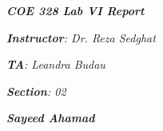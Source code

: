

\begin{titlepage}
    \begin{center}
        \vspace*{1cm}
            
        \date{}
            
        \huge
            
        \textit{\textbf{COE 328 Lab VI Report}}
            
        \vspace{0.25cm}
        
        \vspace{2.5cm}
            
            
            
		\vspace{0.25cm}
            
            
        \LARGE
            

		\textit{\textbf{Instructor}: Dr. Reza Sedghat}

		\textit{\textbf{TA}: Leandra Budau}

		\textit{\textbf{Section}: 02}

		\vspace{2.5cm}

		\vspace{2.5cm}
		
		\vspace{1.5cm}

		\textit{\textbf{Sayeed Ahamad}}
            
            
        \Large         


		\vspace{0cm}            

		\vspace{1cm}
            

\end{center}
\end{titlepage}
